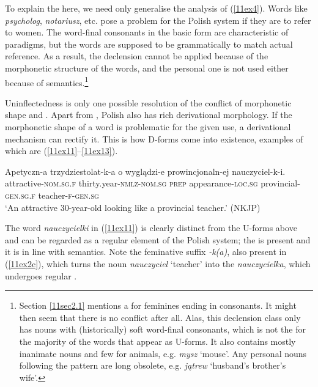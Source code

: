 \documentclass[output=paper,colorlinks,citecolor=brown]{langscibook}
\begin{document}
To explain the  here, we need only generalise the analysis of (\ref{11ex4}). Words like \emph{psycholog}, \emph{notariusz}, etc. pose a problem for the Polish system if they are to refer to women. The word-final consonants in the basic form are characteristic of  paradigms, but the words are supposed to be grammatically  to match actual reference. As a result, the  declension cannot be applied because of the morphonetic structure of the words, and the  personal one is not used either because of semantics.\footnote{Section \ref{11sec2.1} mentions a  for feminines ending in consonants. It might then seem that there is no conflict after all. Alas, this declension class only has nouns with (historically) soft	word-final consonants, which is not the  for the majority of the words that appear as U-forms. It also contains mostly inanimate nouns and few for animals, e.g. \emph{mysz} `mouse'. Any personal nouns following the pattern are long obsolete, e.g. \emph{jątrew} ‘husband's brother's wife'.}

Uninflectedness is only one possible resolution of the conflict of morphonetic shape and . Apart from , Polish also has rich derivational morphology. If the morphonetic shape of a word is problematic for the given use, a derivational mechanism can rectify it. This is how D-forms come into existence, examples of which are (\ref{11ex11}--\ref{11ex13}).

\begin{exe}
	\ex \label{11ex11}
	\gll Apetyczn-a trzydziestolat-k-a o wyglądzi-e prowincjonaln-ej nauczyciel-k-i. \\
	attractive-\textsc{nom.sg.f} thirty.year-\textsc{nmlz-nom.sg} \textsc{prep} appearance-\textsc{loc.sg} provincial-\textsc{gen.sg.f} teacher-\textsc{f-gen.sg} \\
	\trans ‘An attractive 30-year-old looking like a provincial teacher.’ \hfill (NKJP)
\end{exe}

The word \emph{nauczycielki} in (\ref{11ex11}) is clearly distinct from the U-forms above and can be regarded as a regular element of the Polish system; the  is present and it is in line with semantics. Note the feminative suffix \emph{-k(a)}, also present in (\ref{11ex2c}), which turns the  noun \emph{nauczyciel} `teacher' into the  \emph{nauczycielka}, which undergoes regular .
\end{document}
